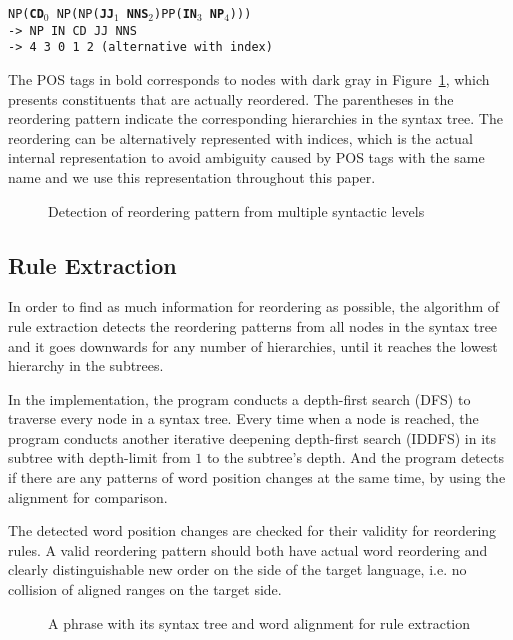 \documentclass[a4paper]{article}
\begin{document}
\noindent \texttt{NP(\textbf{CD}$_0$ NP(NP(\textbf{JJ}$_1$ \textbf{NNS}$_2$)PP(\textbf{IN}$_3$ \textbf{NP}$_4$)))}\medskip\\
\texttt{-> NP IN CD JJ NNS}\\
\texttt{-> 4 3 0 1 2 (alternative with index)}\bigskip

The POS tags in bold corresponds to nodes with dark gray in Figure~\ref{unstructured}, which presents constituents that are actually reordered. The parentheses in the reordering pattern indicate the corresponding hierarchies in the syntax tree. The reordering can be alternatively represented with indices, which is the actual internal representation to avoid ambiguity caused by POS tags with the same name and we use this representation throughout this paper.

\begin{figure}[ht]
\centering

\caption{Detection of reordering pattern from multiple syntactic levels}
\label{unstructured}
\end{figure}

\subsection{Rule Extraction}

In order to find as much information for reordering as possible, the algorithm of rule extraction detects the reordering patterns from all nodes in the syntax tree and it goes downwards for any number of hierarchies, until it reaches the lowest hierarchy in the subtrees.

In the implementation, the program conducts a depth-first search (DFS) to traverse every node in a syntax tree. Every time when a node is reached, the program conducts another iterative deepening depth-first search (IDDFS) in its subtree with depth-limit from $1$ to the subtree's depth. And the program detects if there are any patterns of word position changes at the same time, by using the alignment for comparison.

The detected word position changes are checked for their validity for reordering rules. A valid reordering pattern should both have actual word reordering and clearly distinguishable new order on the side of the target language, i.e. no collision of aligned ranges on the target side.

\begin{figure}[ht]
\centering

\caption{A phrase with its syntax tree and word alignment for rule extraction}
\label{extract}
\end{figure}
\end{document}
